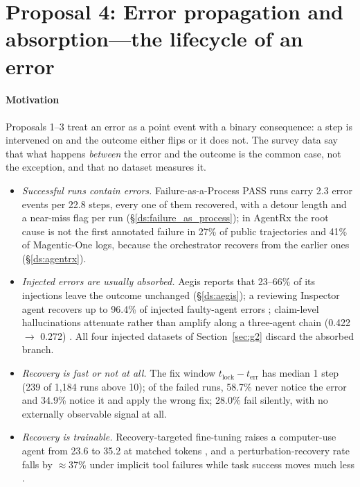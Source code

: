 \documentclass[10pt,a4paper]{article}
\begin{document}

\section{Proposal 4: Error propagation and absorption---the lifecycle of an error}\label{sec:future:lifecycle}

\paragraph{Motivation} Proposals 1--3 treat an error as a point event with a binary consequence: a step is intervened on and the outcome either flips or it does not. The survey data say that what happens \emph{between} the error and the outcome is the common case, not the exception, and that no dataset measures it.
\begin{itemize}[leftmargin=1.1em]
\item \emph{Successful runs contain errors.} Failure-as-a-Process PASS runs carry 2.3 error events per 22.8 steps, every one of them recovered, with a detour length and a near-miss flag per run (\S\ref{ds:failure_as_process}); in AgentRx the root cause is not the first annotated failure in 27\% of public trajectories and 41\% of Magentic-One logs, because the orchestrator recovers from the earlier ones (\S\ref{ds:agentrx}).
\item \emph{Injected errors are usually absorbed.} Aegis reports that 23--66\% of its injections leave the outcome unchanged (\S\ref{ds:aegis}); a reviewing Inspector agent recovers up to 96.4\% of injected faulty-agent errors \cite{huang2024resilience}; claim-level hallucinations attenuate rather than amplify along a three-agent chain (0.422 $\to$ 0.272) \cite{jamshidi2026cascade}. All four injected datasets of Section~\ref{sec:g2} discard the absorbed branch.
\item \emph{Recovery is fast or not at all.} The fix window $t_{\mathrm{lock}}-t_{\mathrm{err}}$ has median 1 step (239 of 1,184 runs above 10); of the failed runs, 58.7\% never notice the error and 34.9\% notice it and apply the wrong fix; 28.0\% fail silently, with no externally observable signal at all.
\item \emph{Recovery is trainable.} Recovery-targeted fine-tuning raises a computer-use agent from 23.6 to 35.2 at matched tokens \cite{cuarecovery2026}, and a perturbation-recovery rate falls by $\approx$37\% under implicit tool failures while task success moves much less \cite{zhu2026toolmaze}.
\end{itemize}
\end{document}
